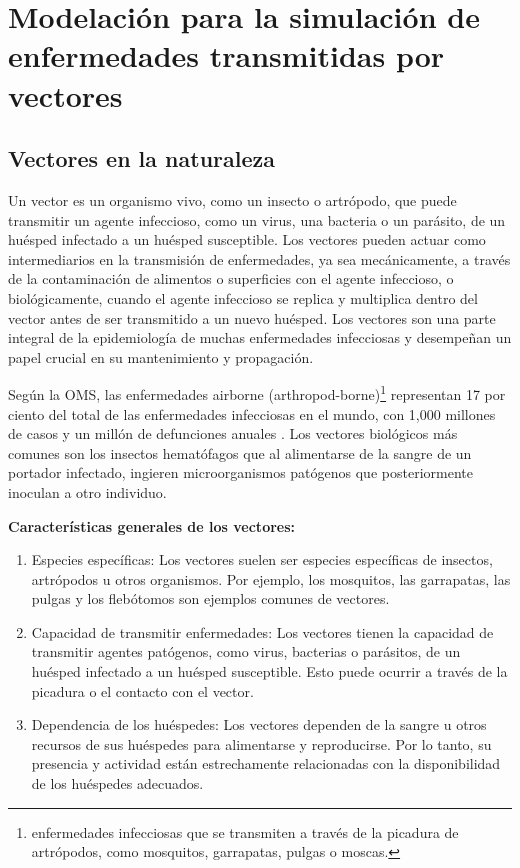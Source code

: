 \chapter{Modelación para la simulación de enfermedades transmitidas por vectores}\label{chapter:proposal}
\section{Vectores en la naturaleza}
Un vector es un organismo vivo, como un insecto o artrópodo, que puede transmitir un agente 
infeccioso, como un virus, una bacteria o un parásito, de un huésped infectado a un huésped 
susceptible. Los vectores pueden actuar como intermediarios en la transmisión de enfermedades, 
ya sea mecánicamente, a través de la contaminación de alimentos o superficies con el agente 
infeccioso, o biológicamente, cuando el agente infeccioso se replica y multiplica dentro del 
vector antes de ser transmitido a un nuevo huésped. Los vectores son una parte integral de la 
epidemiología de muchas enfermedades infecciosas y desempeñan un papel crucial en su mantenimiento 
y propagación.\autocite{Reisen2010}

Según la OMS, las enfermedades airborne (arthropod-borne)\footnote{enfermedades infecciosas que 
se transmiten a través de la picadura de artrópodos, como mosquitos, garrapatas, pulgas o moscas.} 
representan 17 por ciento del total de las enfermedades infecciosas en el mundo, con 1,000 millones 
de casos y un millón de defunciones anuales \autocite{OMS2020}. Los vectores biológicos más 
comunes son los insectos hematófagos que al alimentarse de la sangre de un portador infectado, 
ingieren microorganismos patógenos que posteriormente inoculan a otro individuo.

\textbf{Características generales de los vectores:}\autocite{OMS2020}
\begin{enumerate}
    \item Especies específicas: Los vectores suelen ser especies específicas de insectos, 
    artrópodos u otros organismos. Por ejemplo, los mosquitos, las garrapatas, las pulgas y los 
    flebótomos son ejemplos comunes de vectores. 
    \item Capacidad de transmitir enfermedades: Los vectores tienen la capacidad de transmitir 
    agentes patógenos, como virus, bacterias o parásitos, de un huésped infectado a un huésped 
    susceptible. Esto puede ocurrir a través de la picadura o el contacto con el vector.
    \item Dependencia de los huéspedes: Los vectores dependen de la sangre u otros recursos de 
    sus huéspedes para alimentarse y reproducirse. Por lo tanto, su presencia y actividad están 
    estrechamente relacionadas con la disponibilidad de los huéspedes adecuados.
\end{enumerate}
